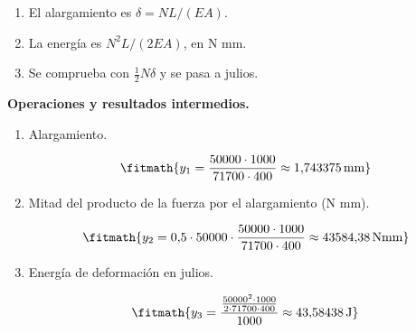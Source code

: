 \begin{enumerate}

\item El alargamiento es $\delta = N L/(E A)$.

\item La energía es $N^2 L/(2 E A)$, en N mm.

\item Se comprueba con $\tfrac12 N\delta$ y se pasa a julios.

\end{enumerate}

\noindent\textbf{Operaciones y resultados intermedios.}

\begin{enumerate}

\item Alargamiento.

\[\fitmath{y_{1}=\frac{50000\cdot 1000}{71700\cdot 400}\approx 1{,}743375\,\mathrm{mm}}\]

\item Mitad del producto de la fuerza por el alargamiento (N mm).

\[\fitmath{y_{2}=0{,}5\cdot 50000\cdot \frac{50000\cdot 1000}{71700\cdot 400}\approx 43584{,}38\,\mathrm{N mm}}\]

\item Energía de deformación en julios.

\[\fitmath{y_{3}=\frac{\frac{{50000}^{2}\cdot 1000}{2\cdot 71700\cdot 400}}{1000}\approx 43{,}58438\,\mathrm{J}}\]

\end{enumerate}
